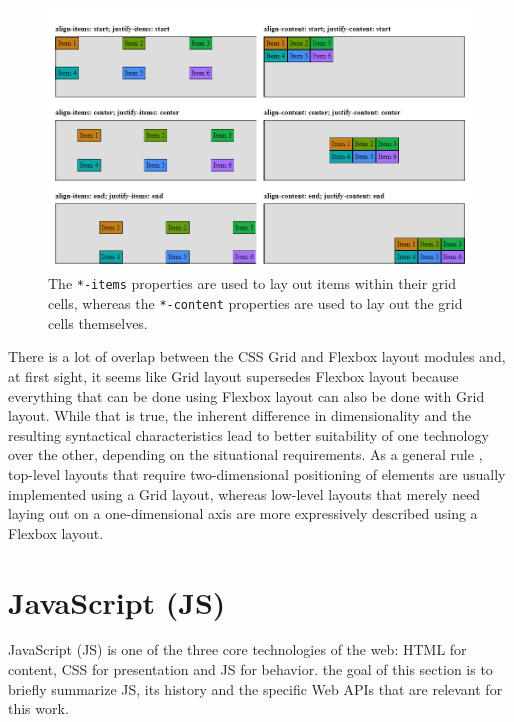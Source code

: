 \begin{figure}[tp]
    \centering
    \includegraphics[keepaspectratio,width=\linewidth,height=\fullh / 2]
    {images/grid-layout-properties.png}

    \caption[Grid Layout Property Comparision]{
        The \lstinline{*-items} properties are used to lay out items within their grid cells, whereas the \lstinline{*-content} properties are used to lay out the grid cells themselves.
    }
    \label{fig:GridLayoutProperties}
\end{figure}

There is a lot of overlap between the CSS Grid and Flexbox layout modules and, at first sight, it seems like Grid layout supersedes Flexbox layout because everything that can be done using Flexbox layout can also be done with Grid layout. While that is true, the inherent difference in dimensionality and the resulting syntactical characteristics lead to better suitability of one technology over the other, depending on the situational requirements. As a general rule \parencite{CSSGridVsFlexbox}, top-level layouts that require two-dimensional positioning of elements are usually implemented using a Grid layout, whereas low-level layouts that merely need laying out on a one-dimensional axis are more expressively described using a Flexbox layout.

\section{JavaScript (JS)}

JavaScript (JS) is one of the three core technologies of the web: HTML for content, CSS for presentation and JS for behavior. the goal of this section is to briefly summarize JS, its history and the specific Web APIs that are relevant for this work.

